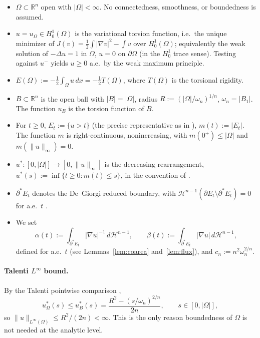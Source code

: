 \documentclass[11pt]{article}
\theoremstyle{definition}
\newcommand{\R}{\mathbb{R}}
\newcommand{\Om}{\Omega}
\begin{document}
\begin{itemize}
\item $\Om\subset\R^{n}$ open with $|\Om|<\infty$. No connectedness,
smoothness, or boundedness is assumed.

\item $u=u_{\Om}\in H^{1}_{0}(\Om)$ is the variational torsion function,
i.e.\ the unique minimizer of $J(v)=\tfrac12\int|\nabla v|^{2}-\int v$
over $H^{1}_{0}(\Om)$; equivalently the weak solution of
$-\Delta u=1$ in $\Om$, $u=0$ on $\partial\Om$ (in the $H^{1}_{0}$ trace
sense). Testing against $u^{-}$ yields $u\ge 0$ a.e.\ by the weak
maximum principle.

\item $E(\Om):=-\tfrac12\int_{\Om}u\,dx=-\tfrac12 T(\Om)$, where
$T(\Om)$ is the torsional rigidity.

\item $B\subset\R^{n}$ is the open ball with $|B|=|\Om|$, radius
$R:=(|\Om|/\omega_{n})^{1/n}$, $\omega_{n}=|B_{1}|$. The function
$u_{B}$ is the torsion function of $B$.

\item For $t\ge 0$, $E_{t}:=\{u>t\}$ (the precise representative as in
\cite[\S 15]{Maggi2012}), $m(t):=|E_{t}|$. The function $m$ is
right-continuous, nonincreasing, with $m(0^{+})\le|\Om|$ and
$m(\|u\|_{\infty})=0$.

\item $u^{*}\colon[0,|\Om|]\to[0,\|u\|_{\infty}]$ is the decreasing
rearrangement, $u^{*}(s):=\inf\{t\ge 0:m(t)\le s\}$, in the convention of
\cite{Kawohl1985,Talenti1976}.

\item $\partial^{*}E_{t}$ denotes the De~Giorgi reduced boundary, with
$\mathcal H^{n-1}(\partial E_{t}\setminus\partial^{*}E_{t})=0$ for a.e.\
$t$ \cite{DeGiorgi1958}.

\item We set
\[
   \alpha(t):=\int_{\partial^{*}E_{t}}|\nabla u|^{-1}\,d\mathcal H^{n-1},
   \qquad
   \beta(t):=\int_{\partial^{*}E_{t}}|\nabla u|\,d\mathcal H^{n-1},
\]
defined for a.e.\ $t$ (see Lemmas~\ref{lem:coarea} and~\ref{lem:flux}), and
$c_{n}:=n^{2}\omega_{n}^{2/n}$.
\end{itemize}

\paragraph{Talenti $L^{\infty}$ bound.} By the Talenti pointwise
comparison \cite{Talenti1976},
\begin{equation}\label{eq:talenti}
   u^{*}_{\Om}(s)\le u^{*}_{B}(s)
   =\frac{R^{2}-(s/\omega_{n})^{2/n}}{2n},
   \qquad s\in[0,|\Om|],
\end{equation}
so $\|u\|_{L^{\infty}(\Om)}\le R^{2}/(2n)<\infty$. This is the only
reason boundedness of $\Om$ is not needed at the analytic level.
\end{document}
